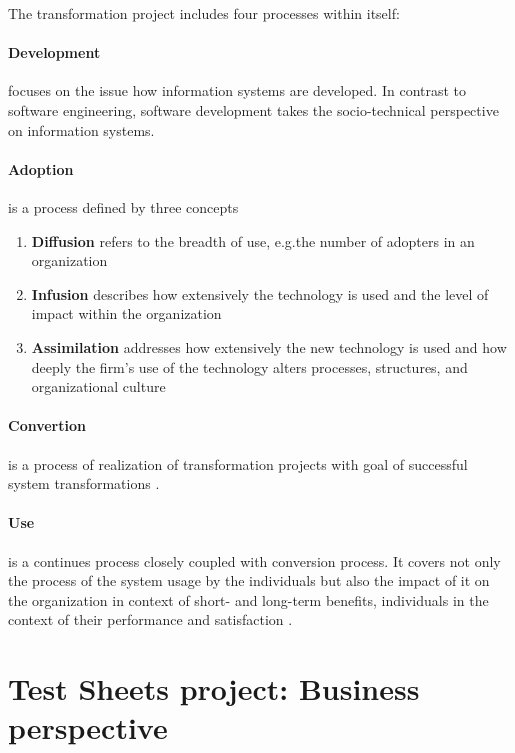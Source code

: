 The transformation project includes four processes within itself:
\paragraph{Development} focuses on the issue how information systems are developed. In contrast to software engineering, software development takes the socio-technical perspective on information systems\cite{MES6}.

\paragraph{Adoption} is a process defined by three concepts\cite{MES7}
\begin{enumerate}
	\item \textbf{Diffusion} refers to the breadth of use, e.g.the number of adopters in an organization
	\item \textbf{Infusion} describes how extensively the technology is used and the level of impact within the organization
	\item \textbf{Assimilation} addresses how extensively the new technology is used and how deeply the firm's use of the technology alters processes, structures, and organizational culture
\end{enumerate}

\paragraph{Convertion} is a process of realization of transformation projects with goal of successful system transformations \cite{MES9}.

\paragraph{Use} is a continues process closely coupled with conversion process. It covers not only the process of the system usage by the individuals but also the impact of it on the organization in context of short- and long-term benefits, individuals in the context of their performance and satisfaction \cite{MES9}.

\section{Test Sheets project: Business perspective}




